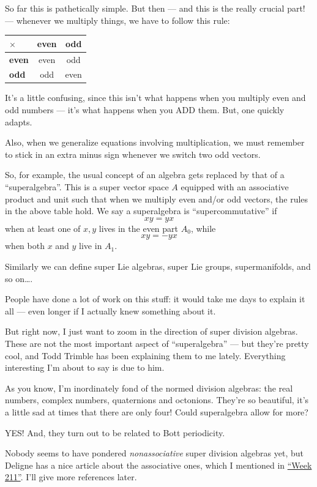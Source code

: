 \documentclass{article}
\begin{document}
So far this is pathetically simple. But then --- and this is the really
crucial part! --- whenever we multiply things, we have to follow this
rule:

\begin{longtable}[]{@{}lcc@{}}
\toprule
\(\times\) & \textbf{even} & \textbf{odd}\tabularnewline
\midrule
\endhead
\textbf{even} & even & odd\tabularnewline
\textbf{odd} & odd & even\tabularnewline
\bottomrule
\end{longtable}

It's a little confusing, since this isn't what happens when you multiply
even and odd numbers --- it's what happens when you ADD them. But, one
quickly adapts.

Also, when we generalize equations involving multiplication, we must
remember to stick in an extra minus sign whenever we switch two odd
vectors.

So, for example, the usual concept of an algebra gets replaced by that
of a ``superalgebra''. This is a super vector space \(A\) equipped with
an associative product and unit such that when we multiply even and/or
odd vectors, the rules in the above table hold. We say a superalgebra is
``supercommutative'' if \[xy = yx\] when at least one of \(x,y\) lives
in the even part \(A_0\), while \[xy = -yx\] when both \(x\) and \(y\)
live in \(A_1\).

Similarly we can define super Lie algebras, super Lie groups,
supermanifolds, and so on\ldots.

People have done a lot of work on this stuff: it would take me days to
explain it all --- even longer if I actually knew something about it.

But right now, I just want to zoom in the direction of super division
algebras. These are not the most important aspect of ``superalgebra''
--- but they're pretty cool, and Todd Trimble has been explaining them
to me lately. Everything interesting I'm about to say is due to him.

As you know, I'm inordinately fond of the normed division algebras: the
real numbers, complex numbers, quaternions and octonions. They're so
beautiful, it's a little sad at times that there are only four! Could
superalgebra allow for more?

YES! And, they turn out to be related to Bott periodicity.

Nobody seems to have pondered \emph{nonassociative} super division
algebras yet, but Deligne has a nice article about the associative ones,
which I mentioned in \protect\hyperlink{week211}{``Week 211''}. I'll
give more references later.
\end{document}
